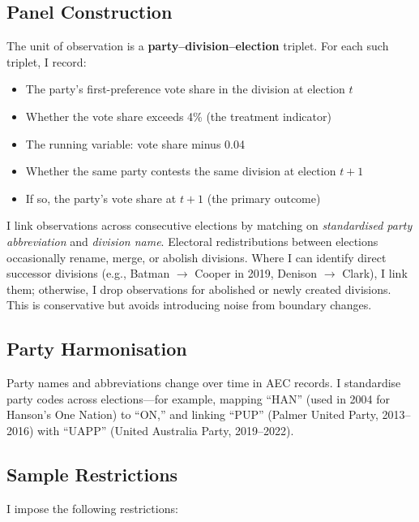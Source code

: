 \documentclass[12pt, a4paper]{article}
\begin{document}
\subsection{Panel Construction}

The unit of observation is a \textbf{party--division--election} triplet. For each such triplet, I record:

\begin{itemize}
    \item The party's first-preference vote share in the division at election $t$
    \item Whether the vote share exceeds 4\% (the treatment indicator)
    \item The running variable: vote share minus 0.04
    \item Whether the same party contests the same division at election $t+1$
    \item If so, the party's vote share at $t+1$ (the primary outcome)
\end{itemize}

I link observations across consecutive elections by matching on \emph{standardised party abbreviation} and \emph{division name}. Electoral redistributions between elections occasionally rename, merge, or abolish divisions. Where I can identify direct successor divisions (e.g., Batman $\to$ Cooper in 2019, Denison $\to$ Clark), I link them; otherwise, I drop observations for abolished or newly created divisions. This is conservative but avoids introducing noise from boundary changes.

\subsection{Party Harmonisation}

Party names and abbreviations change over time in AEC records. I standardise party codes across elections---for example, mapping ``HAN'' (used in 2004 for Hanson's One Nation) to ``ON,'' and linking ``PUP'' (Palmer United Party, 2013--2016) with ``UAPP'' (United Australia Party, 2019--2022).

\subsection{Sample Restrictions}

I impose the following restrictions:
\end{document}
